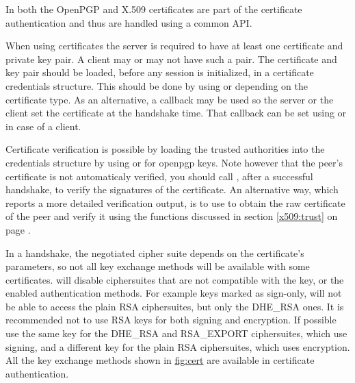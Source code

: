 In \gnutls{} both the OpenPGP and X.509 certificates are part of the
certificate authentication and thus are handled using a common API.
\par
When using certificates the server is required
to have at least one certificate and private key pair. A client
may or may not have such a pair. The certificate and key pair
should be loaded, before any \tls{} session is initialized,
in a certificate credentials structure. This should be done by using
or
depending on the certificate type. As an alternative, a callback may be used
so the server or the client set the certificate at the handshake time.
That callback can be set using
or
in case of a client.
\par
Certificate verification is possible by loading the trusted authorities
into the credentials structure by using
or
for openpgp keys. Note however that the peer's certificate is not automaticaly verified,
you should call ,
after a successful handshake,
to verify the signatures of the certificate. An alternative way, which reports
a more detailed verification output, is to use
 to obtain
the raw certificate of the peer and verify it using the functions discussed in
section \ref{x509:trust} on page \pageref{x509:trust}. 

\par
In a handshake, the negotiated cipher suite depends on the 
certificate's parameters, so not all key exchange methods will be available
with some certificates. \gnutls{} will disable ciphersuites that are not compatible with the key, or
the enabled authentication methods. For example keys marked as sign-only, will not be able to
access the plain RSA ciphersuites, but only the DHE\_RSA ones. It is
recommended not to use RSA keys for both signing and encryption. If possible
use the same key for the DHE\_RSA and RSA\_EXPORT ciphersuites, which use signing,
and a different key for the plain RSA ciphersuites, which uses encryption.
All the key exchange methods shown in \hyperref{figure}{figure }{}{fig:cert} are
available in certificate authentication. 


